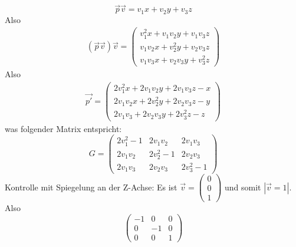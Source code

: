 \documentclass[a4paper,10pt]{report}
\begin{document}
\begin{equation*}
\vec{p}\vec{v} = v_1x+v_2y+v_3z
\end{equation*}
Also
\begin{eqnarray*}
(\vec{p}\vec{v})\vec{v} = \begin{pmatrix}v_1^2x+v_1v_2y+v_1v_3z\\v_1v_2x+v_2^2y+v_2v_3z\\v_1v_3x+v_2v_3y+v_3^2z\end{pmatrix}
\end{eqnarray*}
Also
\begin{eqnarray*}
\vec{p'} = \begin{pmatrix}2v_1^2x + 2v_1v_2y + 2v_1v_3z -x\\2v_1v_2x+2v_2^2 y + 2v_2v_3z -y\\2v_1v_3+2v_2v_3y+2v_3^2z-z\end{pmatrix}
\end{eqnarray*}
was folgender Matrix entspricht:
\begin{equation*}
G = \begin{pmatrix}2v_1^2-1&2v_1v_2&2v_1v_3\\2v_1v_2&2v_2^2-1&2v_2v_3\\2v_1v_3&2v_2v_3&2v_3^2-1\end{pmatrix}
\end{equation*}
Kontrolle mit Spiegelung an der Z-Achse: Es ist $\vec{v}=\begin{pmatrix}0\\0\\1\end{pmatrix}$ und somit $|\vec{v}=1|$. Also
\begin{equation*}
\begin{pmatrix}-1&0&0\\0&-1&0\\0&0&1\end{pmatrix}
\end{equation*}
\newpage
\end{document}

